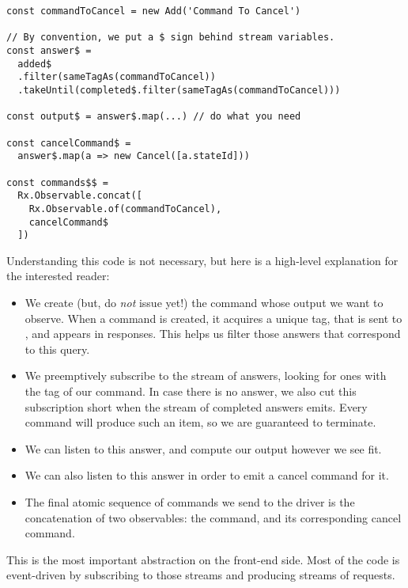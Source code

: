 \begin{verbatim}
const commandToCancel = new Add('Command To Cancel')

// By convention, we put a $ sign behind stream variables.
const answer$ =
  added$
  .filter(sameTagAs(commandToCancel))
  .takeUntil(completed$.filter(sameTagAs(commandToCancel)))

const output$ = answer$.map(...) // do what you need

const cancelCommand$ =
  answer$.map(a => new Cancel([a.stateId]))

const commands$$ =
  Rx.Observable.concat([
    Rx.Observable.of(commandToCancel),
    cancelCommand$
  ])
\end{verbatim}

Understanding this code is not necessary, but here is a high-level explanation
for the interested reader:

\begin{itemize}

  \item We create (but, do \emph{not} issue yet!) the command whose output we
want to observe.  When a command is created, it acquires a unique tag, that is
sent to \Coq{}, and appears in responses.  This helps us filter those answers
that correspond to this query.

  \item We preemptively subscribe to the stream of answers, looking for ones
with the tag of our command.  In case there is no answer, we also cut this
subscription short when the stream of completed answers emits.  Every command
will produce such an item, so we are guaranteed to terminate.

  \item We can listen to this answer, and compute our output however we see
fit.

  \item We can also listen to this answer in order to emit a cancel command for
it.

  \item The final atomic sequence of commands we send to the driver is the
concatenation of two observables: the command, and its corresponding cancel
command.

\end{itemize}

This is the most important abstraction on the front-end side.  Most of the code
is event-driven by subscribing to those streams and producing streams of
requests.
